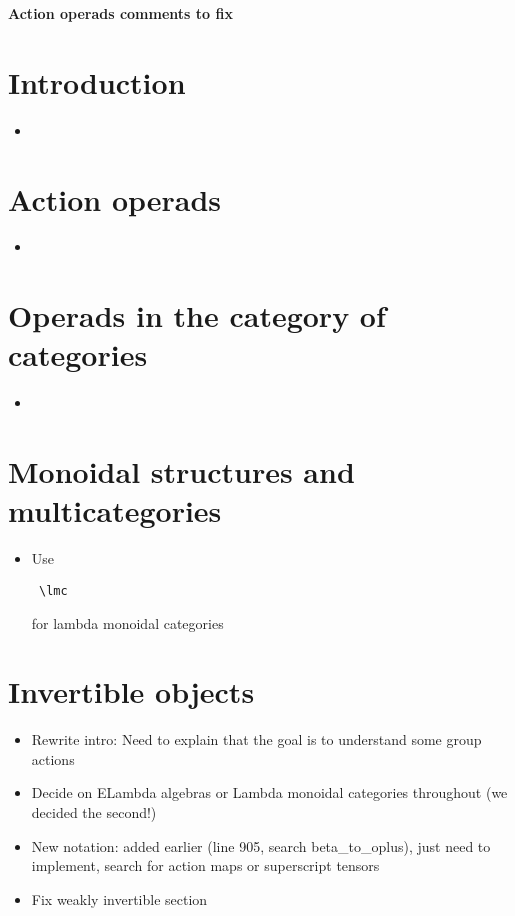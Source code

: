 \documentclass{amsart}
\begin{document}
\begin{center}
\begin{Large}
\textbf{Action operads comments to fix}
\end{Large}
\end{center}
\vskip1cm

\section{ Introduction}
\begin{itemize}
\item

\end{itemize}
\section{ Action operads}
\begin{itemize}
\item

\end{itemize}

\section{Operads in the category of categories}
\begin{itemize}
\item

\end{itemize}

\section{ Monoidal structures and multicategories}

\begin{itemize}
\item Use \begin{verbatim} \lmc \end{verbatim} for lambda monoidal categories
\end{itemize}

\section{ Invertible objects}

\begin{itemize}
\item Rewrite intro: Need to explain that the goal is to understand some group actions
\item Decide on ELambda algebras or Lambda monoidal categories throughout (we decided the second!)
\item New notation: added earlier (line 905, search beta\_to\_oplus), just need to implement, search for action maps or superscript tensors
\item Fix weakly invertible section
\end{itemize}
\end{document}

